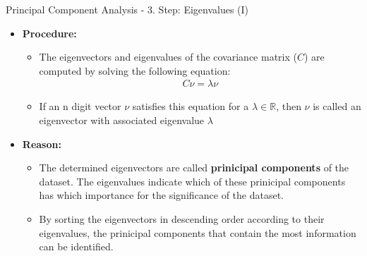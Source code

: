 \begin{frame}{Principal Component Analysis - 3. Step: Eigenvalues (I)}
	\begin{itemize}
		\item \textbf{Procedure:}
		      \begin{itemize}
			      \item The eigenvectors and eigenvalues of the covariance matrix
			            ($C$) are computed by solving the following equation:
			            \begin{align*}
				            C \nu = \lambda \nu
			            \end{align*}
			      \item If an n digit vector $\nu$ satisfies this equation for a
			            $\lambda \in \mathbb{R}$, then $\nu$ is called an eigenvector with
			            associated eigenvalue $\lambda$
		      \end{itemize}
		\item \textbf{Reason:}
		      \begin{itemize}
			      \item The determined eigenvectors are called \textbf{prinicipal
				            components} of the dataset. The eigenvalues indicate which of these
			            prinicipal components has which importance for the significance of
			            the dataset.
			      \item By sorting the eigenvectors in descending order according to
			            their eigenvalues, the prinicipal components that contain the most
			            information can be identified.
		      \end{itemize}
	\end{itemize}
\end{frame}

